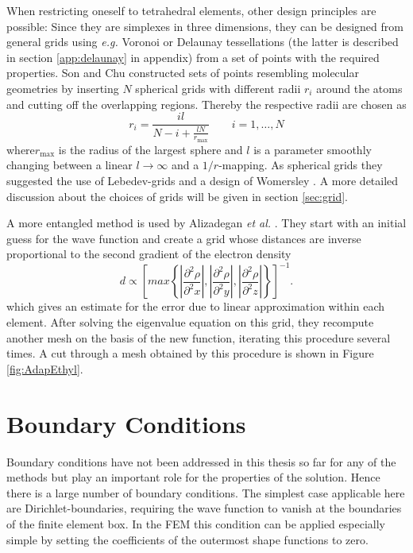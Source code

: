When restricting oneself to tetrahedral elements, other design principles are possible: Since they are simplexes in three dimensions, they can be designed from general grids using \textit{e.g.} Voronoi \cite{voronoi} or Delaunay \cite{delaunay} tessellations (the latter is described in section \ref{app:delaunay} in appendix) from a set of points with the required properties.
Son and Chu \cite{Son_Chu, Son_Chu0} constructed sets of points resembling molecular geometries by inserting $N$ spherical grids with different radii $r_i$ around the atoms and cutting off the overlapping regions.
Thereby the respective radii are chosen as
\begin{equation}
r_i=\frac{il}{N-i+\frac{lN}{r_\text{max}}} \qquad i=1,\hdots ,N 
\end{equation}
where$r_\text{max}$ is the radius of the largest sphere and $l$ is a parameter smoothly changing between a linear $l\rightarrow \infty$ and a $1/r$-mapping.
As spherical grids they suggested the use of Lebedev-grids \cite{lebedev} and a design of Womersley \cite{Womersley2001,Sloan}.
A more detailed discussion about the choices of grids will be given in section \ref{sec:grid}.

A more entangled method is used by Alizadegan \textit{et al.} \cite{fe_hf}. 
They start with an initial guess for the wave function and create a grid whose distances are inverse proportional to the second gradient of the electron density
\[
d \propto \left[ max\left\{\left|\frac{\partial^2 \rho}{\partial^2 x}\right| ,
                           \left|\frac{\partial^2 \rho}{\partial^2 y}\right| ,
                           \left|\frac{\partial^2 \rho}{\partial^2 z}\right| \right\} \right]^{-1}.
\]
which gives an estimate for the error due to linear approximation within each element.
After solving the eigenvalue equation on this grid, they recompute another mesh on the basis of the new function, iterating this procedure several times.
A cut through a mesh obtained by this procedure is shown in Figure \ref{fig:AdapEthyl}.

\section{Boundary Conditions}
\label{ch:BC}
Boundary conditions have not been addressed in this thesis so far for any of the methods but play an important role for the properties of the solution.
Hence there is a large number of boundary conditions.
The simplest case applicable here are Dirichlet-boundaries, requiring the wave function to vanish at the boundaries of the finite element box.
In the FEM this condition can be applied especially simple by setting the coefficients of the outermost shape functions to zero.

